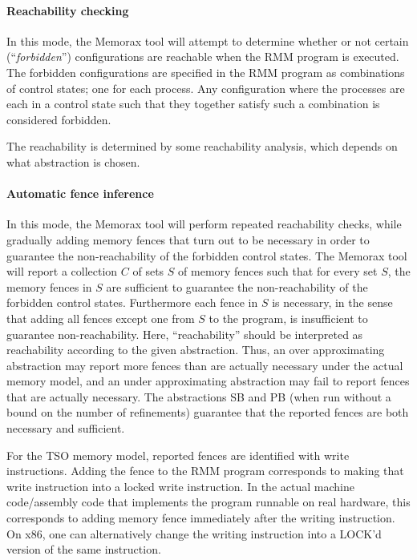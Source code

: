 \documentclass[a4paper]{article}
\newcommand{\thetool}{the Memorax tool} %
\newcommand{\Thetool}{The Memorax tool} %
\begin{document}
\paragraph{Reachability checking}
 In this mode, \thetool{} will attempt to determine whether or not
 certain (``\emph{forbidden}'') configurations are reachable when the
 RMM program is executed. The forbidden configurations are specified
 in the RMM program as combinations of control states; one for each
 process. Any configuration where the processes are each in a control
 state such that they together satisfy such a combination is
 considered forbidden. 

 The reachability is determined by some reachability analysis, which
 depends on what abstraction is chosen.

\paragraph{Automatic fence inference}
In this mode, \thetool{} will perform repeated reachability checks,
while gradually adding memory fences that turn out to be necessary in
order to guarantee the non-reachability of the forbidden control
states. \Thetool{} will report a collection $C$ of sets $S$ of memory
fences such that for every set $S$, the memory fences in $S$ are
sufficient to guarantee the non-reachability of the forbidden control
states. Furthermore each fence in $S$ is necessary, in the sense that
adding all fences except one from $S$ to the program, is insufficient
to guarantee non-reachability. Here, ``reachability'' should be
interpreted as reachability according to the given abstraction. Thus,
an over approximating abstraction may report more fences than are
actually necessary under the actual memory model, and an under
approximating abstraction may fail to report fences that are actually
necessary. The abstractions SB and PB (when run without a bound on the
number of refinements) guarantee that the reported fences are both
necessary and sufficient.

For the TSO memory model, reported fences are identified with write
instructions. Adding the fence to the RMM program corresponds to
making that write instruction into a locked write instruction. In the
actual machine code/assembly code that implements the program runnable
on real hardware, this corresponds to adding memory fence immediately
after the writing instruction. On x86, one can alternatively change
the writing instruction into a LOCK'd version of the same instruction.
\end{document}

